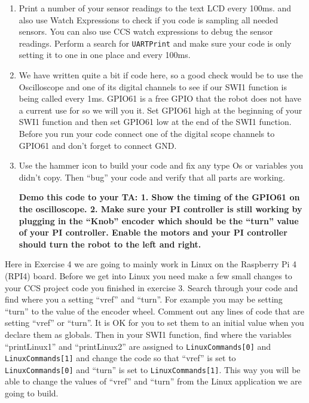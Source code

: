 \documentclass[11pt]{article}
\begin{document}
\begin{enumerate}
\begin{verbatim}
//####################################################################
  // Restore registers saved:
  DINT;
  PieCtrlRegs.PIEIER12.all = TempPIEIER;
}
\end{verbatim}
            \item Print a number of your sensor readings to the text LCD every 100ms. and also use Watch Expressions to check if you code is sampling all needed sensors. You can also use CCS watch expressions to debug the sensor readings. Perform a search for \texttt{UARTPrint} and make sure your code is only setting it to one in one place and every 100ms.
        \item We have written quite a bit if code here, so a good check would be to use the Oscilloscope and one of its digital channels to see if our SWI1 function is being called every 1ms. GPIO61 is a free GPIO that the robot does not have a current use for so we will you it. Set GPIO61 high at the beginning of your SWI1 function and then set GPIO61 low at the end of the SWI1 function. Before you run your code connect one of the digital scope channels to GPIO61 and don’t forget to connect GND.
        \item Use the hammer icon to build your code and fix any type Os or variables you didn’t copy. Then “bug” your code and verify that all parts are working.
            \begin{checkoff}
                    \textbf{Demo this code to your TA: 1. Show the timing of the GPIO61 on the oscilloscope. 2. Make sure your PI controller is still working by plugging in the “Knob” encoder which should be the “turn” value of your PI controller. Enable the motors and your PI controller should turn the robot to the left and right.}
            \end{checkoff}
    \end{enumerate}

    Here in Exercise 4 we are going to mainly work in Linux on the Raspberry Pi 4 (RPI4) board. Before we get into Linux you need make a few small changes to your CCS project code you finished in exercise 3. Search through your code and find where you a setting “vref” and “turn”. For example you may be setting “turn” to the value of the encoder wheel. Comment out any lines of code that are setting “vref” or “turn”. It is OK for you to set them to an initial value when you declare them as globals. Then in your SWI1 function, find where the variables “printLinux1” and “printLinux2” are assigned to \texttt{LinuxCommands[0]} and \texttt{LinuxCommands[1]} and change the code so that “vref” is set to \texttt{LinuxCommands[0]} and “turn” is set to \texttt{LinuxCommands[1]}. This way you will be able to change the values of “vref” and “turn” from the Linux application we are going to build.
\end{document}
